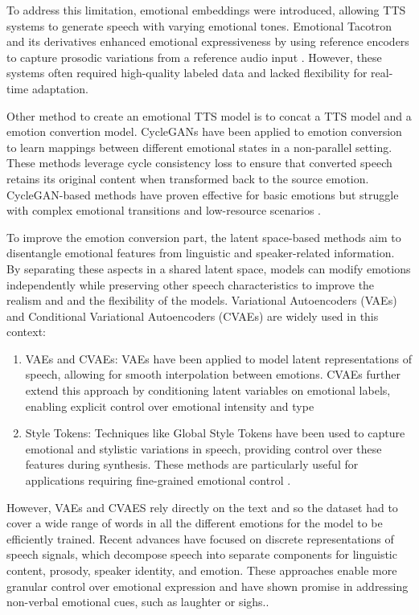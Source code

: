 To address this limitation, emotional embeddings were introduced, allowing TTS systems to generate speech with varying emotional tones. Emotional Tacotron and its derivatives enhanced emotional expressiveness by using reference encoders to capture prosodic variations from a reference audio input \cite{skerry2018towards}. However, these systems often required high-quality labeled data and lacked flexibility for real-time adaptation.

Other method to create an emotional TTS model is to concat a TTS model and a emotion convertion model. CycleGANs have been applied to emotion conversion to learn mappings between different emotional states in a non-parallel setting. These methods leverage cycle consistency loss to ensure that converted speech retains its original content when transformed back to the source emotion. CycleGAN-based methods have proven effective for basic emotions but struggle with complex emotional transitions and low-resource scenarios \cite{kaneko2019cyclegan}.

To improve the emotion conversion part, the latent space-based methods aim to disentangle emotional features from linguistic and speaker-related information. By separating these aspects in a shared latent space, models can modify emotions independently while preserving other speech characteristics to improve the realism and and the flexibility of the models. Variational Autoencoders (VAEs) and Conditional Variational Autoencoders (CVAEs) are widely used in this context:
\begin{enumerate}
\item VAEs and CVAEs: VAEs have been applied to model latent representations of speech, allowing for smooth interpolation between emotions. CVAEs further extend this approach by conditioning latent variables on emotional labels, enabling explicit control over emotional intensity and type \cite{hsu2018hierarchical}
\item Style Tokens: Techniques like Global Style Tokens have been used to capture emotional and stylistic variations in speech, providing control over these features during synthesis. These methods are particularly useful for applications requiring fine-grained emotional control \cite{kwon2019effective}.
\end{enumerate}

However, VAEs and CVAES rely directly on the text and so the dataset had to cover a wide range of words in all the different emotions for the model to be efficiently trained. Recent advances have focused on discrete representations of speech signals, which decompose speech into separate components for linguistic content, prosody, speaker identity, and emotion. These approaches enable more granular control over emotional expression and have shown promise in addressing non-verbal emotional cues, such as laughter or sighs.\cite{kwon2019effective}.

